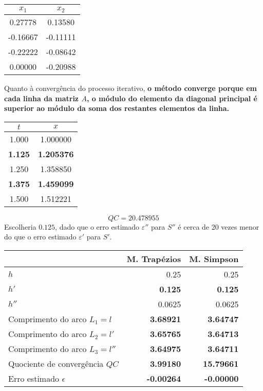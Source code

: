 \setcounter{chapter}{12}
{
\renewcommand{\thesubsection}{\thesection\alph{subsection}}

\begin{center} \begin{tabular}{c | c}
	$x_1$ & $x_2$ \\ \hline
	0.27778  &      0.13580 \\
	-0.16667 &      -0.11111 \\
	-0.22222 &      -0.08642 \\
	0.00000  &      -0.20988
\end{tabular} \end{center}
Quanto à convergência do processo iterativo, \textbf{o método converge porque em cada linha da matriz $A$, o módulo do elemento da diagonal principal é superior ao módulo da soma dos restantes elementos da linha.}


\begin{center} \begin{tabular}{c | c}
	$t$ & $x$ \\ \hline
	1.000 & 1.000000 \\
	\textbf{1.125} & \textbf{1.205376} \\
	1.250 & 1.358850 \\
	\textbf{1.375} & \textbf{1.459099} \\
	1.500 & 1.512221
\end{tabular} \end{center}
\begin{equation*}
	QC=20.478955
\end{equation*}
Escolheria $0.125$, dado que o erro estimado $\varepsilon''$ para $S''$ é cerca de 20 vezes menor do que o erro estimado $\varepsilon'$ para $S'$.


\begin{center} \begin{tabular}{l | r r}
	& M. Trapézios & M. Simpson \\ \hline
	$h$ & 0.25 & 0.25 \\
	$h'$ & \textbf{0.125} & \textbf{0.125} \\
	$h''$ & 0.0625 & 0.0625 \\
	Comprimento do arco $L_1=l  $  & \textbf{3.68921} & \textbf{3.64747} \\
	Comprimento do arco $L_2=l' $  & \textbf{3.65765} & \textbf{3.64713} \\
	Comprimento do arco $L_3=l''$  & \textbf{3.64975} & \textbf{3.64711} \\
	Quociente de convergência $QC$ & \textbf{3.99180} & \textbf{15.79661} \\
	Erro estimado $\epsilon$       & \textbf{-0.00264} & \textbf{-0.00000}
\end{tabular} \end{center}

}
